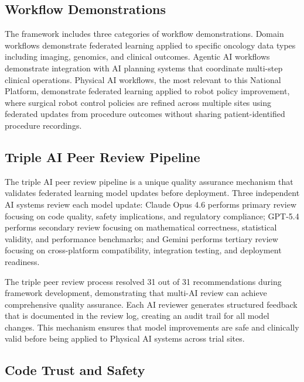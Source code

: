 \subsection{Workflow Demonstrations}
\label{subsec:fl-workflows}

The framework includes three categories of workflow demonstrations. Domain
workflows demonstrate federated learning applied to specific oncology data
types including imaging, genomics, and clinical outcomes. Agentic AI workflows
demonstrate integration with AI planning systems that coordinate multi-step
clinical operations. Physical AI workflows, the most relevant to this National
Platform, demonstrate federated learning applied to robot policy improvement,
where surgical robot control policies are refined across multiple sites using
federated updates from procedure outcomes without sharing patient-identified
procedure recordings.

\subsection{Triple AI Peer Review Pipeline}
\label{subsec:fl-peer-review}

The triple AI peer review pipeline is a unique quality assurance mechanism that
validates federated learning model updates before deployment. Three independent
AI systems review each model update: Claude Opus 4.6 \cite{claude-opus}
performs primary review focusing on code quality, safety implications, and
regulatory compliance; GPT-5.4 \cite{gpt-5-4} performs secondary review
focusing on mathematical correctness, statistical validity, and performance
benchmarks; and Gemini \cite{gemini} performs tertiary review focusing on
cross-platform compatibility, integration testing, and deployment readiness.

The triple peer review process resolved 31 out of 31 recommendations during
framework development, demonstrating that multi-AI review can achieve
comprehensive quality assurance. Each AI reviewer generates structured feedback
that is documented in the review log, creating an audit trail for all model
changes. This mechanism ensures that model improvements are safe and clinically
valid before being applied to Physical AI systems across trial sites.

\subsection{Code Trust and Safety}
\label{subsec:fl-trust}

